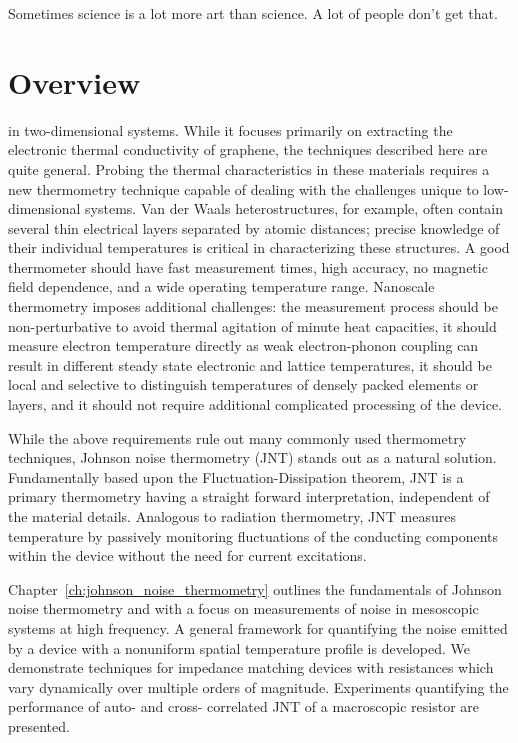 \begin{savequote}[75mm]
Sometimes science is a lot more art than science. A lot of people don't get that.
\end{savequote}
\chapter{Overview}
\label{ch:overview}
 in two-dimensional systems. While it focuses primarily on extracting the electronic thermal conductivity of graphene, the techniques described here are quite general. Probing the thermal characteristics in these materials requires a new thermometry technique capable of dealing with the challenges unique to low-dimensional systems. Van der Waals heterostructures, for example, often contain several thin electrical layers separated by atomic distances; precise knowledge of their individual temperatures is critical in characterizing these structures. A good thermometer should have fast measurement times, high accuracy, no magnetic field dependence, and a wide operating temperature range. Nanoscale thermometry imposes additional challenges: the measurement process should be non-perturbative to avoid thermal agitation of minute heat capacities, it should measure electron temperature directly as weak electron-phonon coupling can result in different steady state electronic and lattice temperatures, it should be local and selective to distinguish temperatures of densely packed elements or layers, and it should not require additional complicated processing of the device.

While the above requirements rule out many commonly used thermometry techniques, Johnson noise thermometry (JNT) stands out as a natural solution. Fundamentally based upon the Fluctuation-Dissipation theorem, JNT is a primary thermometry having a straight forward interpretation, independent of the material details. Analogous to radiation thermometry, JNT measures temperature by passively monitoring fluctuations of the conducting components within the device without the need for current excitations.

Chapter~\ref{ch:johnson_noise_thermometry} outlines the fundamentals of Johnson noise thermometry and with a focus on measurements of noise in mesoscopic systems at high frequency. A general framework for quantifying the noise emitted by a device with a nonuniform spatial temperature profile is developed. We demonstrate techniques for impedance matching devices with resistances which vary dynamically over multiple orders of magnitude. Experiments quantifying the performance of auto- and cross- correlated JNT of a macroscopic resistor are presented.


